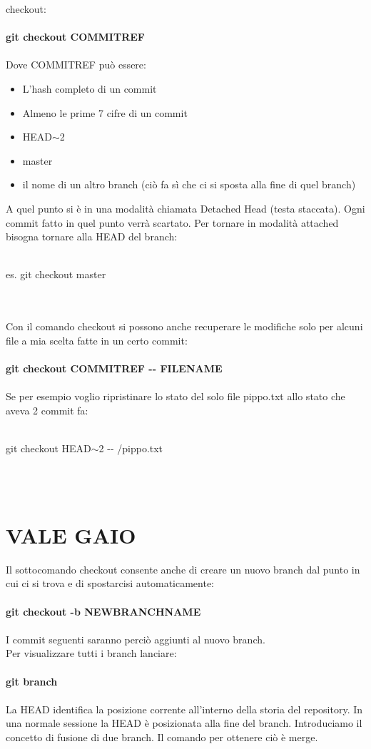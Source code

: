 \documentclass[a4paper,12pt]{report}
\begin{document}
checkout:
\\\\
\textbf{git checkout COMMITREF}
\\\\
Dove COMMITREF può essere:
\begin{itemize}
\item L'hash completo di un commit
\item Almeno le prime 7 cifre di un commit
\item HEAD$\sim$2
\item master
\item il nome di un altro branch (ciò fa sì che ci si sposta alla fine di quel branch)
\end{itemize}
A quel punto si è in una modalità chiamata Detached Head (testa staccata). Ogni commit fatto in quel punto verrà scartato. Per tornare in modalità attached bisogna tornare alla HEAD del branch:
\\\\
\centerline{es. git checkout master}
\\\\
Con il comando checkout si possono anche recuperare le modifiche solo per alcuni file a mia scelta fatte in un certo commit:
\\\\
\textbf{git checkout COMMITREF -{}- FILENAME}
\\\\
Se per esempio voglio ripristinare lo stato del solo file pippo.txt allo stato che aveva 2 commit fa:
\\\\
\centerline{git checkout HEAD$\sim$2 -{}- /pippo.txt}
\\\\
\chapter{VALE GAIO}
Il sottocomando checkout consente anche di creare un nuovo branch dal punto in cui ci si trova e di spostarcisi automaticamente:
\\\\
\textbf{git checkout -b NEWBRANCHNAME}
\\\\
I commit seguenti saranno perciò aggiunti al nuovo branch.
\\
Per visualizzare tutti i branch lanciare:
\\\\
\textbf{git branch}
\\\\
La HEAD identifica la posizione corrente all'interno della storia del repository. In una normale sessione la HEAD è posizionata alla fine del branch.
Introduciamo il concetto di fusione di due branch. Il comando per ottenere ciò è merge.
\end{document}

